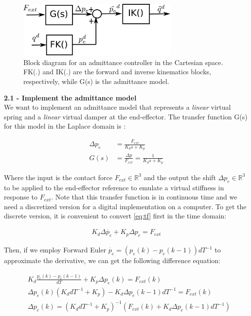 \documentclass[11pt]{article}
\newcommand{\Rnum}{\mathbb{R}} %
\begin{document}
\begin{figure}[bht]
	\centering
	\includegraphics[width=8cm]{pics/admittanceControl.pdf}
	\caption{Block diagram for an admittance controller in the Cartesian space. FK(.) and IK(.) are the forward and inverse kinematics blocks, respectively, while G(s) is the admittance model.}
	\label{fig:admittance}
\end{figure}

\textbf{2.1 - Implement the admittance model }\\
We want to implement an admittance model that represents a \textit{linear} virtual spring and a \textit{linear} virtual damper at the end-effector.
The transfer function G(s) for this model in the Laplace domain is :



\begin{align}
\label{eq:tf}
\Delta p_e &= \frac{ F_{ext} }{K_d s + K_p}\\
G(s)& = \frac{\Delta p}{F_{ext}} = \frac{ 1 }{K_d s + K_p} \nonumber
\end{align}


Where the input is the contact force $F_{ext}\in \Rnum^3$ and the output the shift  $\Delta p_e\in \Rnum^3$ to be applied to the end-effector reference to emulate a virtual stiffness in response to  $F_{ext}$. Note that this transfer function is in continuous time and we need a discretized version for a digital implementation on a computer. To get the discrete version, it is convenient to convert \eqref{eq:tf} first in the time domain:

\begin{align*}
K_d \Delta\dot{ p_e} + K_p{\Delta p_e}  =  F_{ext}  
\end{align*}
 
Then, if  we  employ Forward Euler $\dot{p_e} = (p_e(k)- p_e(k-1))dT^{-1}$ to approximate the derivative, we can get the following difference equation:

\begin{align*}
&K_d \frac{p_e(k)- p_e(k-1)}{dT}  + K_p \Delta p_e(k)  =  F_{ext}(k)  \\
&\Delta p_e(k) (K_d dT^{-1} + K_p ) - K_d \Delta p_e(k-1)dT^{-1} =  F_{ext}(k)\\
&\Delta p_e(k) =  (K_d dT^{-1} + K_p )^{-1} (F_{ext}(k) + K_d \Delta p_e(k-1)dT^{-1})
\end{align*}
\end{document}
